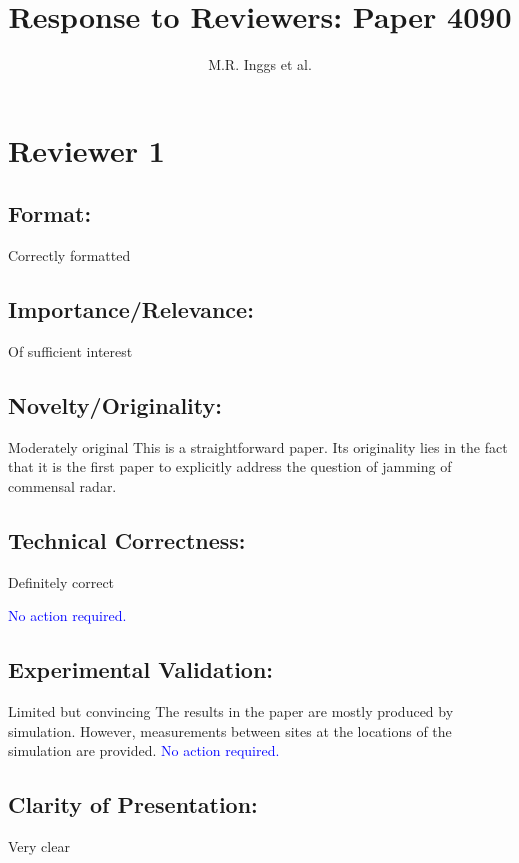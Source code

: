 \documentclass[11pt]{amsart}
\title{Response to Reviewers: Paper 4090}
\author{M.R. Inggs et al.}
\begin{document}
\maketitle

\section{Reviewer 1}
\subsection{
Format:}

 Correctly formatted

\subsection{Importance/Relevance: }
Of sufficient interest

\subsection{Novelty/Originality:}
 Moderately original This is a straightforward paper. Its originality lies in the fact that it is the first paper to explicitly address the question of jamming of commensal radar.
 

\subsection{Technical Correctness: }
Definitely correct

\textcolor{blue}{
No action required.}


\subsection{Experimental Validation: }
Limited but convincing The results in the paper are mostly produced by simulation. However, measurements between sites at the locations of the simulation are provided.
\textcolor{blue}{
No action required.}

\subsection{Clarity of Presentation:}
 Very clear
\end{document}
